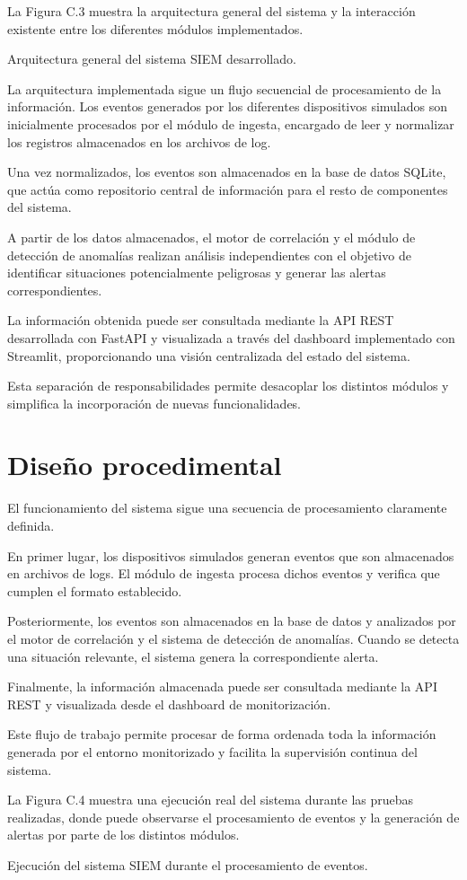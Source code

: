 La Figura C.3 muestra la arquitectura general del sistema y la interacción existente entre los diferentes módulos implementados.

{Arquitectura general del sistema SIEM desarrollado.}

La arquitectura implementada sigue un flujo secuencial de procesamiento de la información. Los eventos generados por los diferentes dispositivos simulados son inicialmente procesados por el módulo de ingesta, encargado de leer y normalizar los registros almacenados en los archivos de log.

Una vez normalizados, los eventos son almacenados en la base de datos SQLite, que actúa como repositorio central de información para el resto de componentes del sistema.

A partir de los datos almacenados, el motor de correlación y el módulo de detección de anomalías realizan análisis independientes con el objetivo de identificar situaciones potencialmente peligrosas y generar las alertas correspondientes.

La información obtenida puede ser consultada mediante la API REST desarrollada con FastAPI y visualizada a través del dashboard implementado con Streamlit, proporcionando una visión centralizada del estado del sistema.

Esta separación de responsabilidades permite desacoplar los distintos módulos y simplifica la incorporación de nuevas funcionalidades.

\section{Diseño procedimental}

El funcionamiento del sistema sigue una secuencia de procesamiento claramente definida.

En primer lugar, los dispositivos simulados generan eventos que son almacenados en archivos de logs. El módulo de ingesta procesa dichos eventos y verifica que cumplen el formato establecido.

Posteriormente, los eventos son almacenados en la base de datos y analizados por el motor de correlación y el sistema de detección de anomalías. Cuando se detecta una situación relevante, el sistema genera la correspondiente alerta.

Finalmente, la información almacenada puede ser consultada mediante la API REST y visualizada desde el dashboard de monitorización.

Este flujo de trabajo permite procesar de forma ordenada toda la información generada por el entorno monitorizado y facilita la supervisión continua del sistema.

La Figura C.4 muestra una ejecución real del sistema durante las pruebas realizadas, donde puede observarse el procesamiento de eventos y la generación de alertas por parte de los distintos módulos.

{Ejecución del sistema SIEM durante el procesamiento de eventos.}
